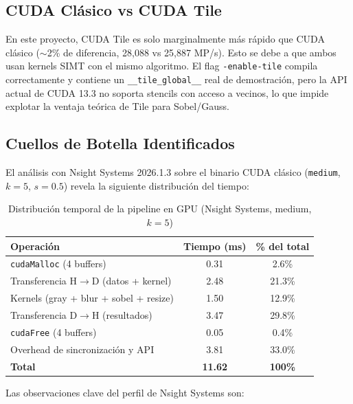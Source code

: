 \documentclass[12pt,a4paper]{article}
\begin{document}
\subsection{CUDA Cl\'asico vs CUDA Tile}

En este proyecto, CUDA Tile es solo marginalmente m\'as r\'apido que CUDA cl\'asico ($\sim$2\% de diferencia, 28,088 vs 25,887 MP/s). Esto se debe a que ambos usan kernels SIMT con el mismo algoritmo. El flag \texttt{-enable-tile} compila correctamente y contiene un \texttt{\_\_tile\_global\_\_} real de demostraci\'on, pero la API actual de CUDA 13.3 no soporta stencils con acceso a vecinos, lo que impide explotar la ventaja te\'orica de Tile para Sobel/Gauss.

\subsection{Cuellos de Botella Identificados}

El an\'alisis con Nsight Systems 2026.1.3 sobre el binario CUDA cl\'asico (\texttt{medium}, $k=5$, $s=0.5$) revela la siguiente distribuci\'on del tiempo:

\begin{table}[H]
\centering
\caption{Distribuci\'on temporal de la pipeline en GPU (Nsight Systems, medium, $k=5$)}
\begin{tabular}{lcc}
\toprule
\textbf{Operaci\'on} & \textbf{Tiempo (ms)} & \textbf{\% del total} \\
\midrule
\texttt{cudaMalloc} (4 buffers) & 0.31 & 2.6\% \\
Transferencia H$\rightarrow$D (datos + kernel) & 2.48 & 21.3\% \\
Kernels (gray + blur + sobel + resize) & 1.50 & 12.9\% \\
Transferencia D$\rightarrow$H (resultados) & 3.47 & 29.8\% \\
\texttt{cudaFree} (4 buffers) & 0.05 & 0.4\% \\
Overhead de sincronizaci\'on y API & 3.81 & 33.0\% \\
\midrule
\textbf{Total} & \textbf{11.62} & \textbf{100\%} \\
\bottomrule
\end{tabular}
\end{table}

Las observaciones clave del perfil de Nsight Systems son:
\end{document}
